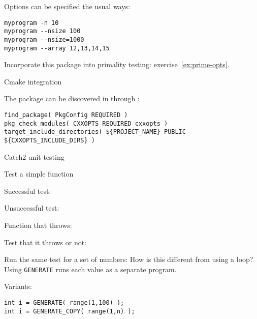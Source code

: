 Options can be specified the usual ways:
\begin{verbatim}
myprogram -n 10
myprogram --nsize 100
myprogram --nsize=1000
myprogram --array 12,13,14,15
\end{verbatim}

\begin{exercise}
  Incorporate this package into primality testing:
  exercise~\ref{ex:prime-opts}.
\end{exercise}

 {Cmake integration}

The  package can be discovered in 
through :
\begingroup\lstset{language=Bash}
\begin{lstlisting}
find_package( PkgConfig REQUIRED )
pkg_check_modules( CXXOPTS REQUIRED cxxopts )
target_include_directories( ${PROJECT_NAME} PUBLIC ${CXXOPTS_INCLUDE_DIRS} )
\end{lstlisting}
\endgroup

 {Catch2 unit testing}
\label{sec:catch2}

Test a simple function

Successful test:

Unsuccessful test:

Function that throws:

Test that it throws or not:

Run the same test for a set of numbers:
How is this different from using a loop?
Using \lstinline{GENERATE} runs each value as a separate program.

Variants:
\begin{lstlisting}
int i = GENERATE( range(1,100) );
int i = GENERATE_COPY( range(1,n) );
\end{lstlisting}
